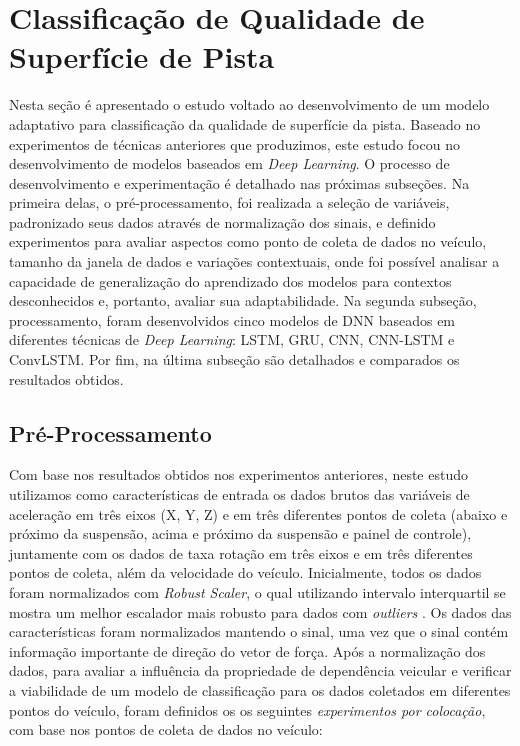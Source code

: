 \chapter{Classificação de Qualidade de Superfície de Pista}
\label{cap:classificacao_qualidade}

Nesta seção é apresentado o estudo voltado ao desenvolvimento de um modelo adaptativo para classificação da qualidade de superfície da pista. Baseado no experimentos de técnicas anteriores que produzimos, este estudo focou no desenvolvimento de modelos baseados em \textit{Deep Learning}. O processo de desenvolvimento e experimentação é detalhado nas próximas subseções. Na primeira delas, o pré-processamento, foi realizada a seleção de variáveis, padronizado seus dados através de normalização dos sinais, e definido experimentos para avaliar aspectos como ponto de coleta de dados no veículo, tamanho da janela de dados e variações contextuais, onde foi possível analisar a capacidade de generalização do aprendizado dos modelos para contextos desconhecidos e, portanto, avaliar sua adaptabilidade. Na segunda subseção, processamento, foram desenvolvidos cinco modelos de DNN baseados em diferentes técnicas de \textit{Deep Learning}: LSTM, GRU, CNN, CNN-LSTM e ConvLSTM. Por fim, na última subseção são detalhados e comparados os resultados obtidos.

\section{Pré-Processamento}

Com base nos resultados obtidos nos experimentos anteriores, neste estudo utilizamos como características de entrada os dados brutos das variáveis de aceleração em três eixos (X, Y, Z) e em três diferentes pontos de coleta (abaixo e próximo da suspensão, acima e próximo da suspensão e painel de controle), juntamente com os dados de taxa rotação em três eixos e em três diferentes pontos de coleta, além da velocidade do veículo. Inicialmente, todos os dados foram normalizados com \textit{Robust Scaler}, o qual utilizando intervalo interquartil se mostra um melhor escalador mais robusto para dados com \textit{outliers} \cite{Vaitheeshwari2019}. Os dados das características foram normalizados mantendo o sinal, uma vez que o sinal contém informação importante de direção do vetor de força. Após a normalização dos dados, para avaliar a influência da propriedade de dependência veicular e verificar a viabilidade de um modelo de classificação para os dados coletados em diferentes pontos do veículo, foram definidos os os seguintes \emph{experimentos por colocação}, com base nos pontos de coleta de dados no veículo:

